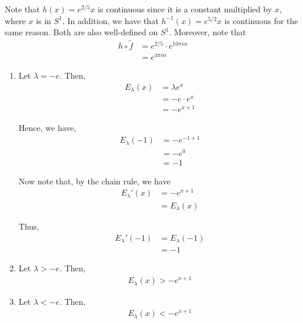 \documentclass[12pt]{article}
\newenvironment{problem}[2][Problem]{\begin{trivlist}
\item[\hskip \labelsep {\bfseries #1}\hskip \labelsep {\bfseries #2.}]}{\end{trivlist}}
\begin{document}
\begin{enumerate}[label=(\alph*)]
Note that $h(x) = e^{2/5}x$ is continuous since it is a constant multiplied by $x$, where $x$ is in $S^1$. In addition, we have that $h^{-1}(x) = e^{5/2}x$ is continuous for the same reason. Both are also well-defined on $S^1$. Moreover, note that 
\begin{align*}
h \circ \tilde{f} &= e^{2/5} \cdot e^{10\pi i \alpha}\\
&= e^{4\pi i \alpha}
\end{align*}

\end{enumerate}

\newpage
\begin{problem}{2}
\end{problem}

\begin{enumerate}[label=(\alph*)]

\item Let $\lambda = -e$. Then,
\begin{align*}
E_{\lambda}(x) &= \lambda e^x\\
&= -e \cdot e^x\\
&= -e^{x+1}
\end{align*}

Hence, we have,
\begin{align*}
E_{\lambda}(-1) &= -e^{-1 + 1}\\
&= -e^0\\
&= -1
\end{align*}

Now note that, by the chain rule, we have
\begin{align*}
E_{\lambda}'(x) &= -e^{x+1}\\
&= E_{\lambda}(x)
\end{align*}

Thus,
\begin{align*}
E_{\lambda}'(-1) &= E_{\lambda}(-1)\\
&= -1
\end{align*}


\item Let $\lambda > -e$. Then,
\begin{align*}
E_{\lambda}(x) > -e^{x+1}
\end{align*}


\item Let $\lambda < -e$. Then,
\begin{align*}
E_{\lambda}(x) < -e^{x+1}
\end{align*}

\end{enumerate}
\end{document}
